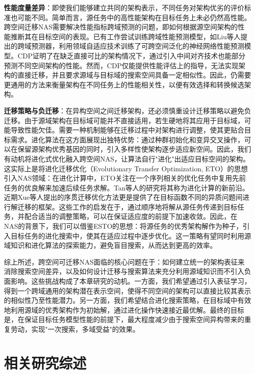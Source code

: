 \documentclass[../main.tex]{subfiles}
\begin{document}
\textbf{性能度量差异}：即使我们能够建立共同的架构表示，不同任务对架构优劣的评价标准也可能不同。简单而言，源任务中的高性能架构在目标任务上未必仍然高性能。跨空间迁移NAS需要解决性能指标跨域预测的问题，即如何根据源空间架构的性能推断其在目标空间的表现。已有工作尝试训练跨域性能预测模型，如Liu等人提出的跨域预测器，利用领域自适应技术训练了可跨空间泛化的神经网络性能预测模型。CDP证明了在缺乏直接可比的架构情况下，通过引入中间对齐技术也能部分预测不同空间架构的性能。然而，CDP仅能提供性能评估上的指导，无法实现架构的直接迁移，并且要求源域与目标域的搜索空间具备一定相似性。因此，仍需要更通用的方法来衡量架构在不同任务上的性能相关性，以便有效选择和转换候选架构。

\textbf{迁移策略与负迁移}：在异构空间之间迁移架构，还必须慎重设计迁移策略以避免负迁移。由于源域架构在目标域可能并不直接适用，若生硬地将其应用于目标域，可能导致性能欠佳。需要一种机制能够在迁移过程中对架构进行调整，使其更贴合目标需求。进化算法在这方面展现出独特优势：通过种群初始化和变异交叉操作，可以在保留源架构优秀基因的同时，引入多样性使架构逐步适应新空间。因此，我们有动机将进化式优化融入跨空间NAS，让算法自行"进化"出适应目标空间的架构。这实际上是将进化迁移优化（Evolutionary Transfer Optimization, ETO）的思想引入NAS领域：在进化计算中，ETO关注在一个序列相关的优化任务中复用先前任务的优良解来加速后续任务求解。Tan等人的研究将其称为进化计算的新前沿。近期Xue等人提出的序贯迁移优化方法更是提供了在目标函数不同的异质问题间进行解迁移的框架。这些工作的启发在于，通过顺序地将解从源任务传递到目标任务，并配合适当的调整策略，可以在保证适应度的前提下加速收敛。因此，在NAS的背景下，我们可以借鉴ESTO的思想：将源任务的优秀架构解作为种子，引入目标任务的进化搜索中，使其在适应过程中逐步优化。这一策略有望同时利用源域知识和进化算法的探索能力，避免盲目搜索，从而达到更高的效率。

综上所述，跨空间可迁移NAS面临的核心问题在于：如何建立统一的架构表征来消除搜索空间差异，以及如何设计迁移与搜索算法来充分利用源域知识而不引入负面影响。这些挑战构成了本章研究的动机。一方面，我们希望通过引入表征学习，得到一个跨域通用的架构潜在表示空间，使得不同空间的架构可以直接比较其表示的相似性乃至性能潜力。另一方面，我们希望结合进化搜索策略，在目标域中有效地利用源域的优秀架构作为初始解，通过进化操作快速接近最优解。最终的目标是，在保证目标任务模型性能的前提下，最大程度减少由于搜索空间异构带来的重复劳动，实现"一次搜索，多域受益"的效果。

\section[\hspace{-2pt}相关研究综述]{\heiti{}\hspace{-8pt}相关研究综述}
\label{sec:chapter4_related_work}
\end{document}
